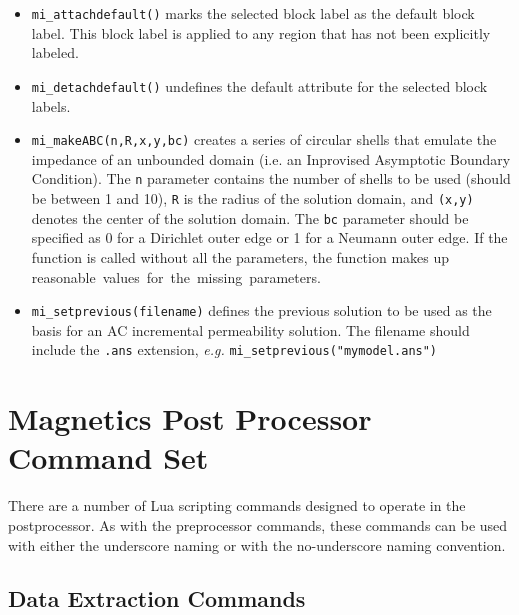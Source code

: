 \begin{itemize}
\item{\tt mi\_attachdefault()} marks the
selected block label as the default block label.  This block label
is applied to any region that has not been explicitly labeled.

\item{\tt mi\_detachdefault()} undefines the default
attribute for the selected block labels.

\item{\tt mi\_makeABC(n,R,x,y,bc)} creates a series of circular shells that emulate the
impedance of an unbounded domain (i.e. an Inprovised Asymptotic Boundary
Condition).  The {\tt n} parameter contains the number of shells to be used
(should be between 1 and 10), {\tt R} is the radius of the solution domain, and
{\tt (x,y)} denotes the center of the solution domain.  The {\tt bc} parameter should
be specified as 0 for a Dirichlet outer edge or 1 for a Neumann outer edge.
If the function is called without all the parameters, the function makes up
reasonable values for the missing parameters. 

\item{\tt mi\_setprevious(filename)} defines the previous solution to be used as the basis for an AC incremental
permeability solution.  The filename should include the {\tt .ans} extension, {\em e.g.} {\tt mi\_setprevious("mymodel.ans")}

\end{itemize}

\section{Magnetics Post Processor Command Set}

There are a number of Lua scripting commands designed to operate in
the postprocessor.  As with the preprocessor commands, these
commands can be used with either the underscore naming or with the
no-underscore naming convention.

\subsection{Data Extraction Commands}

